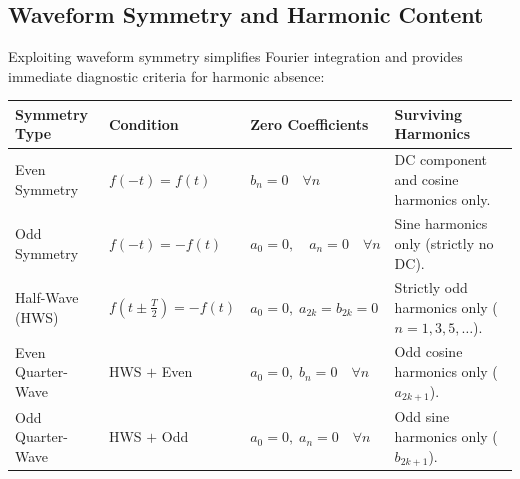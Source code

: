 \documentclass[12pt,a4paper]{article}
\renewcommand{\arraystretch}{1.45}
\begin{document}
\subsection{Waveform Symmetry and Harmonic Content}
Exploiting waveform symmetry simplifies Fourier integration and provides immediate diagnostic criteria for harmonic absence:

\par\vspace{6pt}\noindent
\begingroup
\setlength{\tabcolsep}{4.5pt}
\setlength{\extrarowheight}{2.5pt}
\renewcommand{\arraystretch}{1.30}
\begin{tabularx}{\linewidth}{|B{2.6cm}|B{3.2cm}|B{3.2cm}|Y|}
\hline
\textbf{Symmetry Type} & \textbf{Condition} & \textbf{Zero Coefficients} & \textbf{Surviving Harmonics} \\
\hline
Even Symmetry & $f(-t) = f(t)$ & $b_n = 0 \quad \forall n$ & DC component and cosine harmonics only. \\
\hline
Odd Symmetry & $f(-t) = -f(t)$ & $a_0 = 0, \quad a_n = 0 \quad \forall n$ & Sine harmonics only (strictly no DC). \\
\hline
Half-Wave (HWS) & $f(t \pm \frac{T}{2}) = -f(t)$ & $a_0 = 0, \; a_{2k} = b_{2k} = 0$ & Strictly odd harmonics only ($n = 1, 3, 5, \dots$). \\
\hline
Even Quarter-Wave & HWS $+$ Even & $a_0 = 0, \; b_n = 0 \quad \forall n$ & Odd cosine harmonics only ($a_{2k+1}$). \\
\hline
Odd Quarter-Wave & HWS $+$ Odd & $a_0 = 0, \; a_n = 0 \quad \forall n$ & Odd sine harmonics only ($b_{2k+1}$). \\
\hline
\end{tabularx}
\endgroup
\end{document}
